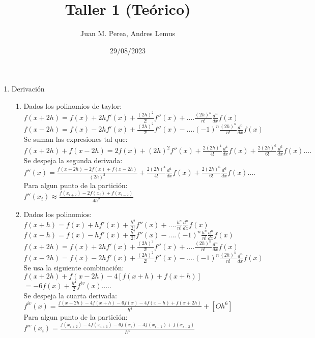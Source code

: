 \documentclass{article}
\title{Taller 1 (Teórico)}
\author{Juan M. Perea, Andres Lemus}
\date{29/08/2023}
\begin{document}
\maketitle

\begin{enumerate}
\renewcommand{\theenumi}{\roman{enumi}}
\item Derivación
	\begin{enumerate}
	\renewcommand{\theenumii}{\arabic{enumii}}
	\item
		Dados los polinomios de taylor:\\
		$f(x+2h)=f(x)+2hf'(x)+\frac{(2h)^2}{2!}f''(x)+....\frac{(2h)^n}{n!}\frac{d^n}{dx}f(x)$\\
		$f(x-2h)=f(x)-2hf'(x)+\frac{(2h)^2}{2!}f''(x)-....(-1)^n\frac{(2h)^n}{n!}\frac{d^n}{dx}f(x)$\\
		Se suman las expresiones tal que:\\
		$f(x+2h)+f(x-2h)=2f(x)+(2h)^2f''(x)+\frac{2(2h)^4}{4!}\frac{d^4}{dx}f(x)+\frac{2(2h)^6}{6!}\frac{d^6}{dx}f(x)....$\\
		Se despeja la segunda derivada:\\
		$f''(x)=\frac{f(x+2h)-2f(x)+f(x-2h)}{(2h)^2}+\frac{2(2h)^4}{4!}\frac{d^4}{dx}f(x)+\frac{2(2h)^6}{6!}\frac{d^6}{dx}f(x)....$\\
		Para algun punto de la partición:\\
		$f''(x_i)\approx\frac{f(x_{i+2})-2f(x_i)+f(x_{i-2})}{4h^2}$
		\addtocounter{enumii}{3}
	\item 
		Dados los polinomios:\\
		$f(x+h)=f(x)+hf'(x)+\frac{h^2}{2!}f''(x)+....\frac{h^n}{n!}\frac{d^n}{dx}f(x)$\\
		$f(x-h)=f(x)-hf'(x)+\frac{h^2}{2!}f''(x)-....(-1)^n\frac{h^n}{n!}\frac{d^n}{dx}f(x)$\\
		$f(x+2h)=f(x)+2hf'(x)+\frac{(2h)^2}{2!}f''(x)+....\frac{(2h)^n}{n!}\frac{d^n}{dx}f(x)$\\
		$f(x-2h)=f(x)-2hf'(x)+\frac{(2h)^2}{2!}f''(x)-....(-1)^n\frac{(2h)^n}{n!}\frac{d^n}{dx}f(x)$\\
		Se usa la siguiente combinación:\\
		$f(x+2h)+f(x-2h)-4[f(x+h)+f(x+h)]$\\
		$=-6f(x)+\frac{h^4}{2}f^{iv}(x).....$\\
		Se despeja la cuarta derivada:\\
		$f^{iv}(x)=\frac{f(x+2h)-4f(x+h)-6f(x)-4f(x-h)+f(x+2h)}{h^4}+[Oh^6]$\\
		Para algun punto de la partición:\\
		$f^{iv}(x_i)=\frac{f(x_{i+2})-4f(x_{i+1})-6f(x_i)-4f(x_{i-1})+f(x_{i-2})}{h^4}$
	\end{enumerate}
\end{enumerate}
\end{document}
